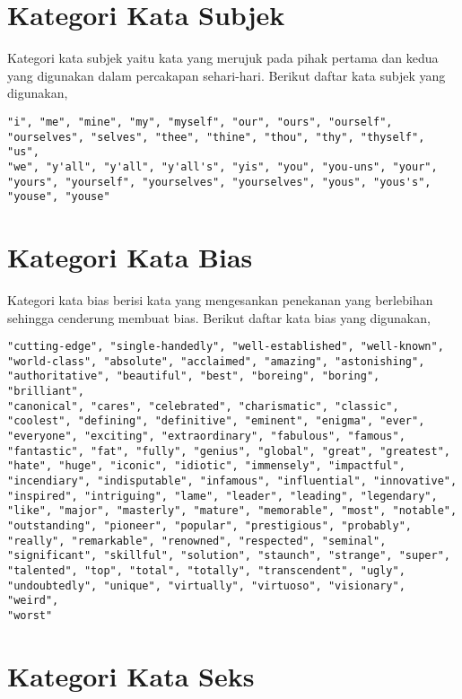 \section{Kategori Kata Subjek}
\label{lampiran:words_pronoun}

Kategori kata subjek yaitu kata yang merujuk pada pihak pertama dan kedua yang
digunakan dalam percakapan sehari-hari.
Berikut daftar kata subjek yang digunakan,

\begin{lstlisting}
"i", "me", "mine", "my", "myself", "our", "ours", "ourself",
"ourselves", "selves", "thee", "thine", "thou", "thy", "thyself", "us",
"we", "y'all", "y'all", "y'all's", "yis", "you", "you-uns", "your",
"yours", "yourself", "yourselves", "yourselves", "yous", "yous's",
"youse", "youse"
\end{lstlisting}


\section{Kategori Kata Bias}
\label{lampiran:words_bias}

Kategori kata bias berisi kata yang mengesankan penekanan yang berlebihan
sehingga cenderung membuat bias.
Berikut daftar kata bias yang digunakan,

\begin{lstlisting}
"cutting-edge", "single-handedly", "well-established", "well-known",
"world-class", "absolute", "acclaimed", "amazing", "astonishing",
"authoritative", "beautiful", "best", "boreing", "boring", "brilliant",
"canonical", "cares", "celebrated", "charismatic", "classic",
"coolest", "defining", "definitive", "eminent", "enigma", "ever",
"everyone", "exciting", "extraordinary", "fabulous", "famous",
"fantastic", "fat", "fully", "genius", "global", "great", "greatest",
"hate", "huge", "iconic", "idiotic", "immensely", "impactful",
"incendiary", "indisputable", "infamous", "influential", "innovative",
"inspired", "intriguing", "lame", "leader", "leading", "legendary",
"like", "major", "masterly", "mature", "memorable", "most", "notable",
"outstanding", "pioneer", "popular", "prestigious", "probably",
"really", "remarkable", "renowned", "respected", "seminal",
"significant", "skillful", "solution", "staunch", "strange", "super",
"talented", "top", "total", "totally", "transcendent", "ugly",
"undoubtedly", "unique", "virtually", "virtuoso", "visionary", "weird",
"worst"
\end{lstlisting}

\section{Kategori Kata Seks}
\label{lampiran:words_sex}

